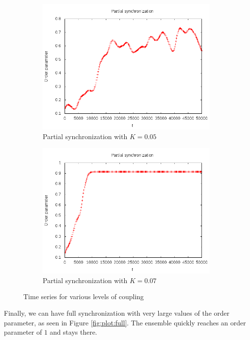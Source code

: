 \documentclass[12pt]{article}
\begin{document}
\begin{figure}
\begin{subfigure}[b]{0.4\textwidth}
\includegraphics[width=\textwidth]{data/partialsm}
\caption{Partial synchronization with $K=0.05$}
\label{fig:plot:partial1}
\end{subfigure}
\begin{subfigure}[b]{0.4\textwidth}
\centering
\includegraphics[width=\textwidth]{data/partialmore}
\caption{Partial synchronization with $K=0.07$}
\label{fig:plot:partial2}
\end{subfigure}
\caption{Time series for various levels of coupling}
\end{figure}

Finally, we can have full synchronization with very large values of the order parameter, as seen in Figure \ref{fig:plot:full}. The ensemble quickly reaches an order parameter of $1$ and stays there.
\end{document}
